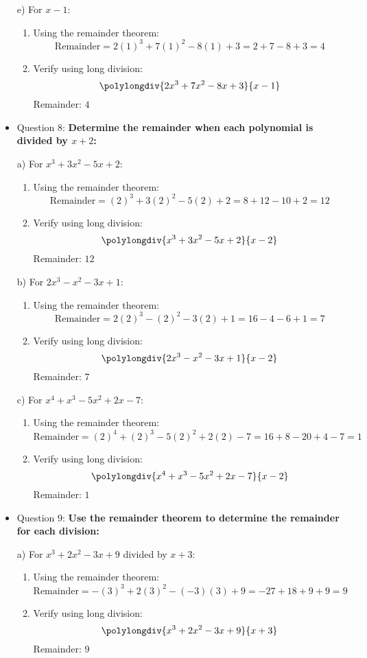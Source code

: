 \documentclass{article}
\begin{document}
\begin{itemize}
e) For \(x - 1\):
\begin{enumerate}
    \item Using the remainder theorem:
    \[
    \text{Remainder} = 2(1)^3 + 7(1)^2 - 8(1) + 3 = 2 + 7 - 8 + 3 = 4
    \]
    \item Verify using long division:
    \[
    \polylongdiv{2x^3 + 7x^2 - 8x + 3}{x - 1}
    \]
    Remainder: \(4\)
\end{enumerate}

\item Question 8:
\textbf{Determine the remainder when each polynomial is divided by \(x + 2\):}

a) For \(x^3 + 3x^2 - 5x + 2\):
\begin{enumerate}
    \item Using the remainder theorem:
    \[
    \text{Remainder} = (2)^3 + 3(2)^2 - 5(2) + 2 = 8 + 12 - 10 + 2 = 12
    \]
    \item Verify using long division:
    \[
    \polylongdiv{x^3 + 3x^2 - 5x + 2}{x - 2}
    \]
    Remainder: \(12\)
\end{enumerate}

b) For \(2x^3 - x^2 - 3x + 1\):
\begin{enumerate}
    \item Using the remainder theorem:
    \[
    \text{Remainder} = 2(2)^3 - (2)^2 - 3(2) + 1 = 16 - 4 - 6 + 1 = 7
    \]
    \item Verify using long division:
    \[
    \polylongdiv{2x^3 - x^2 - 3x + 1}{x - 2}
    \]
    Remainder: \(7\)
\end{enumerate}

c) For \(x^4 + x^3 - 5x^2 + 2x - 7\):
\begin{enumerate}
    \item Using the remainder theorem:
    \[
    \text{Remainder} = (2)^4 + (2)^3 - 5(2)^2 + 2(2) - 7 = 16 + 8 - 20 + 4 - 7 = 1
    \]
    \item Verify using long division:
    \[
    \polylongdiv{x^4 + x^3 - 5x^2 + 2x - 7}{x - 2}
    \]
    Remainder: \(1\)
\end{enumerate}

\item Question 9:
\textbf{Use the remainder theorem to determine the remainder for each division:}

a) For \(x^3 + 2x^2 - 3x + 9\) divided by \(x + 3\):
\begin{enumerate}
    \item Using the remainder theorem:
    \[
    \text{Remainder} = -(3)^3 + 2(3)^2 - (-3)(3) + 9 = -27 + 18 + 9 + 9 = 9
    \]
    \item Verify using long division:
    \[
    \polylongdiv{x^3 + 2x^2 - 3x + 9}{x + 3}
    \]
    Remainder: \(9\)
\end{enumerate}


\end{itemize}
\end{document}
